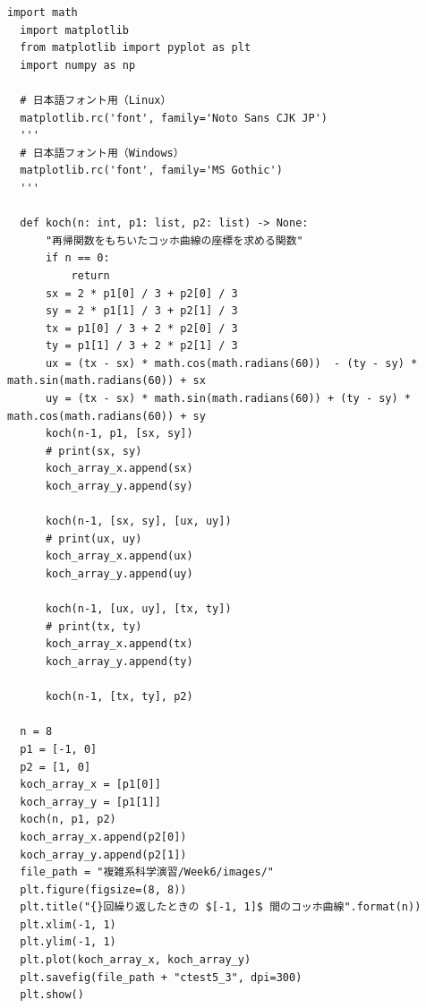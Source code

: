 \begin{lstlisting}[caption=koch.py]
  import math
  import matplotlib
  from matplotlib import pyplot as plt
  import numpy as np

  # 日本語フォント用（Linux）
  matplotlib.rc('font', family='Noto Sans CJK JP')
  '''
  # 日本語フォント用（Windows）
  matplotlib.rc('font', family='MS Gothic')
  '''

  def koch(n: int, p1: list, p2: list) -> None:
      "再帰関数をもちいたコッホ曲線の座標を求める関数"
      if n == 0:
          return
      sx = 2 * p1[0] / 3 + p2[0] / 3
      sy = 2 * p1[1] / 3 + p2[1] / 3
      tx = p1[0] / 3 + 2 * p2[0] / 3
      ty = p1[1] / 3 + 2 * p2[1] / 3
      ux = (tx - sx) * math.cos(math.radians(60))  - (ty - sy) * math.sin(math.radians(60)) + sx
      uy = (tx - sx) * math.sin(math.radians(60)) + (ty - sy) * math.cos(math.radians(60)) + sy
      koch(n-1, p1, [sx, sy])
      # print(sx, sy)
      koch_array_x.append(sx)
      koch_array_y.append(sy)

      koch(n-1, [sx, sy], [ux, uy])
      # print(ux, uy)
      koch_array_x.append(ux)
      koch_array_y.append(uy)

      koch(n-1, [ux, uy], [tx, ty])
      # print(tx, ty)
      koch_array_x.append(tx)
      koch_array_y.append(ty)

      koch(n-1, [tx, ty], p2)

  n = 8
  p1 = [-1, 0]
  p2 = [1, 0]
  koch_array_x = [p1[0]]
  koch_array_y = [p1[1]]
  koch(n, p1, p2)
  koch_array_x.append(p2[0])
  koch_array_y.append(p2[1])
  file_path = "複雑系科学演習/Week6/images/"
  plt.figure(figsize=(8, 8))
  plt.title("{}回繰り返したときの $[-1, 1]$ 間のコッホ曲線".format(n))
  plt.xlim(-1, 1)
  plt.ylim(-1, 1)
  plt.plot(koch_array_x, koch_array_y)
  plt.savefig(file_path + "ctest5_3", dpi=300)
  plt.show()
\end{lstlisting}